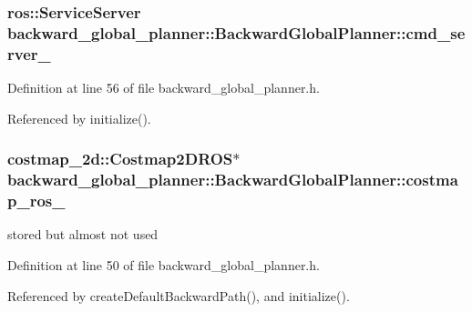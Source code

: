 \subsubsection[{\texorpdfstring{cmd\+\_\+server\+\_\+}{cmd_server_}}]{\setlength{\rightskip}{0pt plus 5cm}ros\+::\+Service\+Server backward\+\_\+global\+\_\+planner\+::\+Backward\+Global\+Planner\+::cmd\+\_\+server\+\_\+\hspace{0.3cm}{\ttfamily [private]}}\hypertarget{classbackward__global__planner_1_1BackwardGlobalPlanner_a7d9647a5c5e35794af7ebc14827f5b35}{}\label{classbackward__global__planner_1_1BackwardGlobalPlanner_a7d9647a5c5e35794af7ebc14827f5b35}


Definition at line 56 of file backward\+\_\+global\+\_\+planner.\+h.



Referenced by initialize().

\subsubsection[{\texorpdfstring{costmap\+\_\+ros\+\_\+}{costmap_ros_}}]{\setlength{\rightskip}{0pt plus 5cm}costmap\+\_\+2d\+::\+Costmap2\+D\+R\+OS$\ast$ backward\+\_\+global\+\_\+planner\+::\+Backward\+Global\+Planner\+::costmap\+\_\+ros\+\_\+\hspace{0.3cm}{\ttfamily [private]}}\hypertarget{classbackward__global__planner_1_1BackwardGlobalPlanner_afacbfb009c468d3c47959ca413eb6606}{}\label{classbackward__global__planner_1_1BackwardGlobalPlanner_afacbfb009c468d3c47959ca413eb6606}


stored but almost not used 



Definition at line 50 of file backward\+\_\+global\+\_\+planner.\+h.



Referenced by create\+Default\+Backward\+Path(), and initialize().

